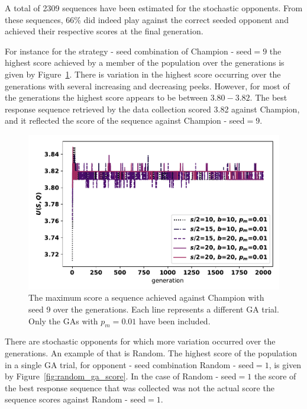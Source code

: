 A total of 2309 sequences have been estimated for the stochastic opponents. From
these sequences, 66\% did indeed play against the correct seeded opponent and
achieved their respective scores at the final generation.

For instance for the strategy - seed combination of Champion - seed\(=9\) the highest score
achieved by a member of the population over the generations is given by
Figure~\ref{fig:champion_ga_score}. There is variation in the highest score
occurring over the generations with several increasing and decreasing peeks. However,
for most of the generations the highest score appears to be between \(3.80 - 3.82\).
The best response sequence retrieved by the data collection scored 3.82 against
Champion, and it reflected the score of the sequence against Champion - seed\(=9\).

\begin{figure}[!htbp]
    \centering
    \includegraphics[width=.7\textwidth]{src/chapters/06/img/maximum_score_per_generation_champion.pdf}
    \caption{The maximum score a sequence achieved against Champion with seed 9
    over the generations. Each line represents a different GA trial. Only the
    GAs with \(p_m=0.01\) have been included.}\label{fig:champion_ga_score}
\end{figure}

There are stochastic opponents for which more variation occurred over the
generations. An example of that is Random. The highest score
of the population in a single GA trial, for opponent - seed combination Random -
seed\(=1\), is given by Figure~\ref{fig:random_ga_score}.
In the case of Random - seed\(=1\) the score of the best response sequence that
was collected was not the actual score the sequence scores against Random -
seed\(=1\).

